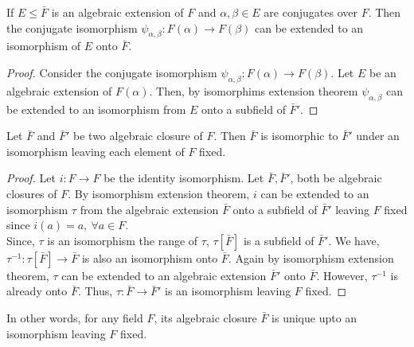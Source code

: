 \begin{corollary}
	If $E \le \bar{F}$ is an algebraic extension of $F$ and $\alpha,\beta \in E$ are conjugates over $F$.
	Then the conjugate isomorphism $\psi_{\alpha,\beta} : F(\alpha) \to F(\beta)$ can be extended to an isomorphism of $E$ onto $\bar{F}$.
\end{corollary}
\begin{proof}
	Consider the conjugate isomorphism $\psi_{\alpha,\beta} : F(\alpha) \to F(\beta)$.
	Let $E$ be an algebraic extension of $F(\alpha)$.
	Then, by isomorphims extension theorem $\psi_{\alpha,\beta}$ can be extended to an isomorphism from $E$ onto a subfield of $\bar{F}'$.
\end{proof}

\begin{corollary}
	Let $\bar{F}$ and $\bar{F}'$ be two algebraic closure of $F$.
	Then $\bar{F}$ is isomorphic to $\bar{F}'$ under an isomorphism leaving each element of $F$ fixed.
\end{corollary}
\begin{proof}
	Let $i : F \to F$ be the identity isomorphism.
	Let $\bar{F}, \bar{F}'$, both be algebraic closures of $F$.
	By isomorphism extension theorem, $i$ can be extended to an isomorphism $\tau$ from the algebraic extension $\bar{F}$ onto a subfield of $\bar{F}'$ leaving $F$ fixed since $i(a) = a,\ \forall a \in F$.\\

	Since, $\tau$ is an isomorphism the range of $\tau$, $\tau[\bar{F}]$ is a subfield of $\bar{F}'$.
	We have, $\tau^{-1} : \tau[\bar{F}] \to \bar{F}$ is also an isomorphism onto $\bar{F}$.
	Again by isomorphism extension theorem, $\tau$ can be extended to an algebraic extension $\bar{F}'$ onto $\bar{F}$.
	However, $\tau^{-1}$ is already onto $\bar{F}$.
	Thus, $\tau : \bar{F} \to \bar{F}'$ is an isomorphism leaving $F$ fixed.
\end{proof}
\begin{important}
	In other words, for any field $F$, its algebraic closure $\bar{F}$ is unique upto an isomorphism leaving $F$ fixed.
\end{important}

